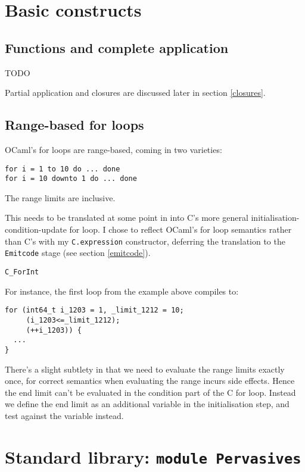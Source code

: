 \documentclass[12pt,a4paper,twoside,openright]{report}
\begin{document}
\section{Basic constructs}

\subsection{Functions and complete application}\label{functions}

TODO

Partial application and closures are discussed later in section \ref{closures}.

\subsection{Range-based for loops}\label{for-loops}

OCaml's for loops are range-based, coming in two varieties:
\begin{lstlisting}
for i = 1 to 10 do ... done
for i = 10 downto 1 do ... done
\end{lstlisting}

The range limits are inclusive.

This needs to be translated at some point in into C's more general
initialisation-condition-update for loop. I chose to reflect OCaml's for loop
semantics rather than C's with my \lstinline!C.expression!
constructor, deferring the translation to the \lstinline!Emitcode! stage (see
section \ref{emitcode}).

\lstinline!C_ForInt!

For instance, the first loop from the example above
compiles to:

\begin{lstlisting}
for (int64_t i_1203 = 1, _limit_1212 = 10;
     (i_1203<=_limit_1212);
     (++i_1203)) {
  ...
}
\end{lstlisting}

There's a slight subtlety in that we need to evaluate the range limits exactly
once, for correct semantics when evaluating the range incurs side effects.
Hence the end limit can't be evaluated in the condition part of the C for loop.
Instead we define the end limit as an additional variable in the initialisation
step, and test against the variable instead.


\section{Standard library: \texttt{module Pervasives}}
\end{document}
